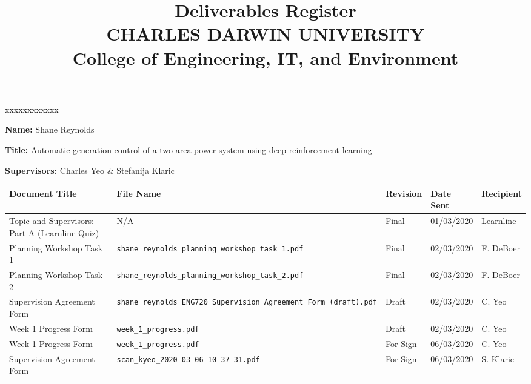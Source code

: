 \documentclass[10pt, landscape]{article}
\title{	
		Deliverables Register\\
		CHARLES DARWIN UNIVERSITY\\
		College of Engineering, IT, and Environment
	  }
\author{}
\date{}
\begin{document}
	
	\maketitle
	
	\begin{namelist}{xxxxxxxxxxxx}
		\item[{\bf Name:}]
			Shane Reynolds
		\item[{\bf Title:}]
			Automatic generation control of a two area power system using deep reinforcement learning
		\item[{\bf Supervisors:}]
			Charles Yeo \& Stefanija Klaric
	\end{namelist}
	
	\small
	\begin{tabular}{p{7cm}p{10cm}p{1.5cm}p{2cm}p{2cm}}
	\toprule
	\textbf{Document Title}							& \textbf{File Name}				& \textbf{Revision} & \textbf{Date Sent} 	& \textbf{Recipient} \\
	\midrule
	Topic and Supervisors: Part A (Learnline Quiz)	& N/A								& Final 			& 01/03/2020		 	& Learnline\\
	Planning Workshop Task 1						& \verb|shane_reynolds_planning_workshop_task_1.pdf|						& Final				& 02/03/2020		 	& F. DeBoer\\
	Planning Workshop Task 2						& \verb|shane_reynolds_planning_workshop_task_2.pdf|						& Final				& 02/03/2020			& F. DeBoer\\
	Supervision Agreement Form						& \verb|shane_reynolds_ENG720_Supervision_Agreement_Form_(draft).pdf|						& Draft				& 02/03/2020			& C. Yeo\\
	Week 1 Progress Form						& \verb|week_1_progress.pdf|						& Draft				& 02/03/2020			& C. Yeo\\
	Week 1 Progress Form							& \verb|week_1_progress.pdf|									& 				For Sign			& 06/03/2020			& C. Yeo\\
	Supervision Agreement Form						& \verb|scan_kyeo_2020-03-06-10-37-31.pdf|						& 				For Sign			& 06/03/2020			& S. Klaric\\
	\bottomrule
	\end{tabular}
\end{document}
